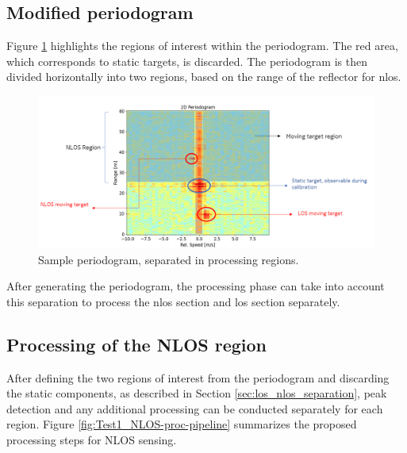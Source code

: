 	
		\subsection{Modified periodogram}
		
			Figure \ref{fig:Rad_nlos_los_separation} highlights the regions of interest within the periodogram.
			The red area, which corresponds to static targets, is discarded. The periodogram is then divided horizontally into two regions, based on the range of the reflector for \gls{nlos}.
			
			\begin{figure}[H]
				\centering
				\includegraphics[width=1.1\textwidth]{Images/Test1/nlos-los-separation.png}
				\caption{\small Sample periodogram, separated in processing regions.}
				\label{fig:Rad_nlos_los_separation}
			\end{figure}
			
			
			After generating the periodogram, the processing phase can take into account this separation to process the \gls{nlos} section and \gls{los} section separately.
		
		\subsection{Processing of the NLOS region}
		
			After defining the two regions of interest from the periodogram and discarding the static components, as described in Section \ref{sec:los_nlos_separation}, peak detection and any additional processing can be conducted separately for each region. 
			Figure \ref{fig:Test1_NLOS-proc-pipeline} summarizes the proposed processing steps for NLOS sensing.
			
			
